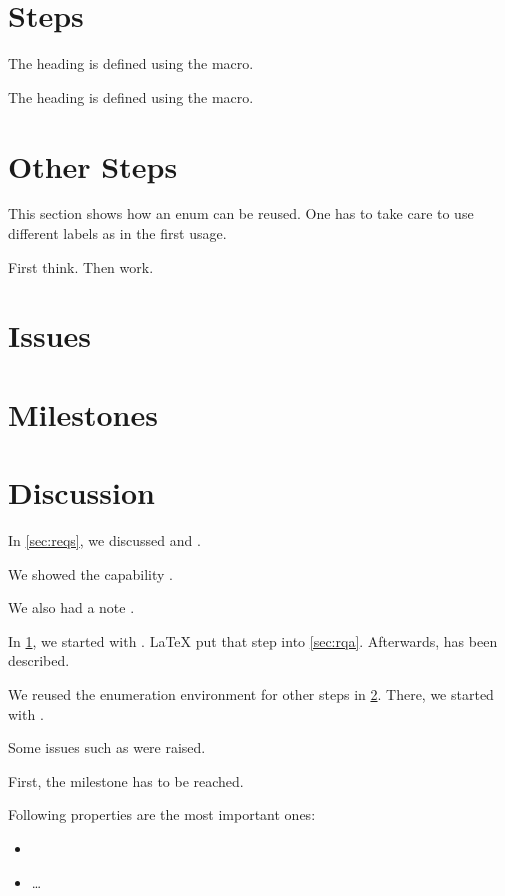\documentclass[parskip=full]{scrartcl}
\begin{document}
\section{Steps}
\label{sec:steps}

\label{sec:rqa}
The heading is defined using the macro.

The heading is defined using the macro.

\section{Other Steps}
\label{sec:osteps}

This section shows how an enum can be reused.
One has to take care to use different labels as in the first usage.

\setcounter{Step}{0}
 First think.
 Then work.

\section{Issues}



\section{Milestones}
\label{sec:milestones}


\section{Discussion}
\label{sec:discussion}
In \cref{sec:reqs}, we discussed  and .

We showed the capability .

We also had a note .

In \cref{sec:steps}, we started with .
\LaTeX{} put that step into \cref{sec:rqa}.
Afterwards,  has been described.

We reused the enumeration environment for other steps in \cref{sec:osteps}.
There, we started with .

Some issues such as  were raised.

First, the milestone  has to be reached.

Following properties are the most important ones:
\begin{itemize}
\item {}
\item \ldots
\end{itemize}
\end{document}
